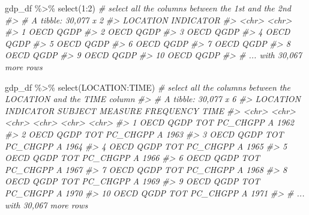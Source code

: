 \documentclass[
]{article}
\newenvironment{Shaded}{\begin{snugshade}}{\end{snugshade}}
\newcommand{\CommentTok}[1]{\textcolor[rgb]{0.56,0.35,0.01}{\textit{#1}}}
\newcommand{\DecValTok}[1]{\textcolor[rgb]{0.00,0.00,0.81}{#1}}
\newcommand{\FunctionTok}[1]{\textcolor[rgb]{0.00,0.00,0.00}{#1}}
\newcommand{\NormalTok}[1]{#1}
\newcommand{\SpecialCharTok}[1]{\textcolor[rgb]{0.00,0.00,0.00}{#1}}
\begin{document}
\begin{Shaded}
\begin{Highlighting}[]
\NormalTok{gdp\_df }\SpecialCharTok{\%\textgreater{}\%} 
  \FunctionTok{select}\NormalTok{(}\DecValTok{1}\SpecialCharTok{:}\DecValTok{2}\NormalTok{) }\CommentTok{\# select all the columns between the 1st and the 2nd}
\CommentTok{\#\textgreater{} \# A tibble: 30,077 x 2}
\CommentTok{\#\textgreater{}    LOCATION INDICATOR}
\CommentTok{\#\textgreater{}    \textless{}chr\textgreater{}    \textless{}chr\textgreater{}    }
\CommentTok{\#\textgreater{}  1 OECD     QGDP     }
\CommentTok{\#\textgreater{}  2 OECD     QGDP     }
\CommentTok{\#\textgreater{}  3 OECD     QGDP     }
\CommentTok{\#\textgreater{}  4 OECD     QGDP     }
\CommentTok{\#\textgreater{}  5 OECD     QGDP     }
\CommentTok{\#\textgreater{}  6 OECD     QGDP     }
\CommentTok{\#\textgreater{}  7 OECD     QGDP     }
\CommentTok{\#\textgreater{}  8 OECD     QGDP     }
\CommentTok{\#\textgreater{}  9 OECD     QGDP     }
\CommentTok{\#\textgreater{} 10 OECD     QGDP     }
\CommentTok{\#\textgreater{} \# ... with 30,067 more rows}

\NormalTok{gdp\_df }\SpecialCharTok{\%\textgreater{}\%} 
  \FunctionTok{select}\NormalTok{(LOCATION}\SpecialCharTok{:}\NormalTok{TIME) }\CommentTok{\# select all the columns between the LOCATION and the TIME column}
\CommentTok{\#\textgreater{} \# A tibble: 30,077 x 6}
\CommentTok{\#\textgreater{}    LOCATION INDICATOR SUBJECT MEASURE  FREQUENCY TIME }
\CommentTok{\#\textgreater{}    \textless{}chr\textgreater{}    \textless{}chr\textgreater{}     \textless{}chr\textgreater{}   \textless{}chr\textgreater{}    \textless{}chr\textgreater{}     \textless{}chr\textgreater{}}
\CommentTok{\#\textgreater{}  1 OECD     QGDP      TOT     PC\_CHGPP A         1962 }
\CommentTok{\#\textgreater{}  2 OECD     QGDP      TOT     PC\_CHGPP A         1963 }
\CommentTok{\#\textgreater{}  3 OECD     QGDP      TOT     PC\_CHGPP A         1964 }
\CommentTok{\#\textgreater{}  4 OECD     QGDP      TOT     PC\_CHGPP A         1965 }
\CommentTok{\#\textgreater{}  5 OECD     QGDP      TOT     PC\_CHGPP A         1966 }
\CommentTok{\#\textgreater{}  6 OECD     QGDP      TOT     PC\_CHGPP A         1967 }
\CommentTok{\#\textgreater{}  7 OECD     QGDP      TOT     PC\_CHGPP A         1968 }
\CommentTok{\#\textgreater{}  8 OECD     QGDP      TOT     PC\_CHGPP A         1969 }
\CommentTok{\#\textgreater{}  9 OECD     QGDP      TOT     PC\_CHGPP A         1970 }
\CommentTok{\#\textgreater{} 10 OECD     QGDP      TOT     PC\_CHGPP A         1971 }
\CommentTok{\#\textgreater{} \# ... with 30,067 more rows}


\end{Highlighting}
\end{Shaded}
\end{document}
